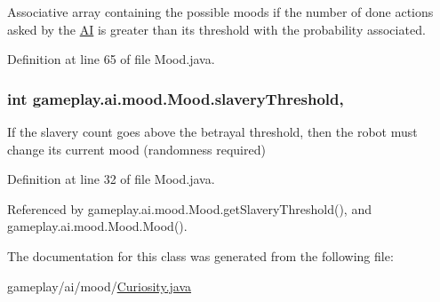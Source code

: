 Associative array containing the possible moods if the number of done actions asked by the \hyperlink{classgameplay_1_1ai_1_1_a_i}{A\-I} is greater than its threshold with the probability associated. 



Definition at line 65 of file Mood.\-java.

\hypertarget{classgameplay_1_1ai_1_1mood_1_1_mood_a12c9abed7c077f9013956cda08e41619}{
\subsubsection[{slavery\-Threshold}]{\setlength{\rightskip}{0pt plus 5cm}int gameplay.\-ai.\-mood.\-Mood.\-slavery\-Threshold\hspace{0.3cm}{\ttfamily [protected]}, {\ttfamily [inherited]}}}\label{classgameplay_1_1ai_1_1mood_1_1_mood_a12c9abed7c077f9013956cda08e41619}


If the slavery count goes above the betrayal threshold, then the robot must change its current mood (randomness required) 



Definition at line 32 of file Mood.\-java.



Referenced by gameplay.\-ai.\-mood.\-Mood.\-get\-Slavery\-Threshold(), and gameplay.\-ai.\-mood.\-Mood.\-Mood().



The documentation for this class was generated from the following file\-:\begin{DoxyCompactItemize}
\item 
gameplay/ai/mood/\hyperlink{_curiosity_8java}{Curiosity.\-java}\end{DoxyCompactItemize}

